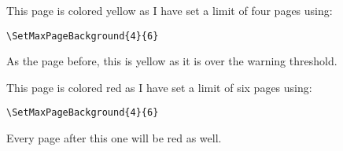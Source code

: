 \documentclass[a4paper]{article}
\begin{document}
\clearpage

\noindent This page is colored yellow as I have set a limit of four pages using:
\begin{verbatim}
\SetMaxPageBackground{4}{6}
\end{verbatim}

\clearpage

\noindent As the page before, this is yellow as it is over the warning threshold.

\clearpage

\noindent This page is colored red as I have set a limit of six pages using:
\begin{verbatim}
\SetMaxPageBackground{4}{6}
\end{verbatim}

\noindent Every page after this one will be red as well.
\end{document}
